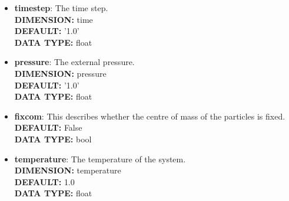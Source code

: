 \begin{itemize}
\item {\bf timestep}:
 The time step.
{\\ \bf DIMENSION: }time
{\\ \bf DEFAULT: }'1.0'
{\\ \bf DATA TYPE: }float
\item {\bf pressure}:
 The external pressure.
{\\ \bf DIMENSION: }pressure
{\\ \bf DEFAULT: }'1.0'
{\\ \bf DATA TYPE: }float
\item {\bf fixcom}:
 This describes whether the centre of mass of the particles is fixed.
{\\ \bf DEFAULT: }False
{\\ \bf DATA TYPE: }bool
\item {\bf temperature}:
 The temperature of the system.
{\\ \bf DIMENSION: }temperature
{\\ \bf DEFAULT: }1.0
{\\ \bf DATA TYPE: }float
\end{itemize}
 
